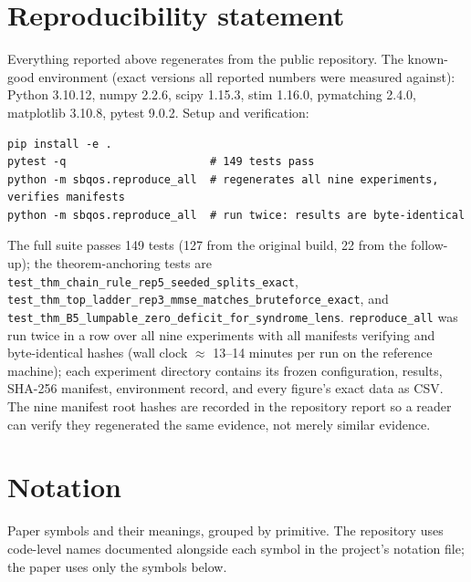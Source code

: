 \documentclass[11pt]{article}
\theoremstyle{definition}
\begin{document}
 \section{Reproducibility statement}
\label{sec:repro}

Everything reported above regenerates from the public repository. The known-good environment (exact versions all reported numbers were measured against): Python 3.10.12, numpy 2.2.6, scipy 1.15.3, stim 1.16.0, pymatching 2.4.0, matplotlib 3.10.8, pytest 9.0.2. Setup and verification:

\begin{verbatim}
pip install -e .
pytest -q                      # 149 tests pass
python -m sbqos.reproduce_all  # regenerates all nine experiments, verifies manifests
python -m sbqos.reproduce_all  # run twice: results are byte-identical
\end{verbatim}

The full suite passes 149 tests (127 from the original build, 22 from the follow-up); the theorem-anchoring tests are \texttt{test\_thm\_chain\_rule\_rep5\_seeded\_splits\_exact}, \texttt{test\_thm\_top\_ladder\_rep3\_mmse\_matches\_bruteforce\_exact}, and \texttt{test\_thm\_B5\_lumpable\_zero\_deficit\_for\_syndrome\_lens}. \texttt{reproduce\_all} was run twice in a row over all nine experiments with all manifests verifying and byte-identical hashes (wall clock $\approx$ 13--14 minutes per run on the reference machine); each experiment directory contains its frozen configuration, results, SHA-256 manifest, environment record, and every figure's exact data as CSV. The nine manifest root hashes are recorded in the repository report so a reader can verify they regenerated the same evidence, not merely similar evidence. 

 
\appendix
\section{Notation}
\label{app:notation}

Paper symbols and their meanings, grouped by primitive. The repository uses code-level names documented alongside each symbol in the project's notation file; the paper uses only the symbols below.
\end{document}
